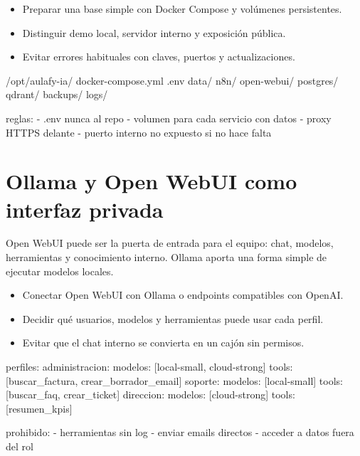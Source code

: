 \documentclass[11pt,a4paper]{book}
\begin{document}
\begin{itemize}\item Preparar una base simple con Docker Compose y volúmenes persistentes.\end{itemize}
\begin{itemize}\item Distinguir demo local, servidor interno y exposición pública.\end{itemize}
\begin{itemize}\item Evitar errores habituales con claves, puertos y actualizaciones.\end{itemize}
\begin{codebox}
/opt/aulafy-ia/
  docker-compose.yml
  .env
  data/
    n8n/
    open-webui/
    postgres/
    qdrant/
  backups/
  logs/

reglas:
  - .env nunca al repo
  - volumen para cada servicio con datos
  - proxy HTTPS delante
  - puerto interno no expuesto si no hace falta
\end{codebox}
\chapter{Ollama y Open WebUI como interfaz privada}
Open WebUI puede ser la puerta de entrada para el equipo: chat, modelos, herramientas y conocimiento interno. Ollama aporta una forma simple de ejecutar modelos locales.

\begin{itemize}\item Conectar Open WebUI con Ollama o endpoints compatibles con OpenAI.\end{itemize}
\begin{itemize}\item Decidir qué usuarios, modelos y herramientas puede usar cada perfil.\end{itemize}
\begin{itemize}\item Evitar que el chat interno se convierta en un cajón sin permisos.\end{itemize}
\begin{codebox}
perfiles:
  administracion:
    modelos: [local-small, cloud-strong]
    tools: [buscar_factura, crear_borrador_email]
  soporte:
    modelos: [local-small]
    tools: [buscar_faq, crear_ticket]
  direccion:
    modelos: [cloud-strong]
    tools: [resumen_kpis]

prohibido:
  - herramientas sin log
  - enviar emails directos
  - acceder a datos fuera del rol
\end{codebox}
\end{document}
